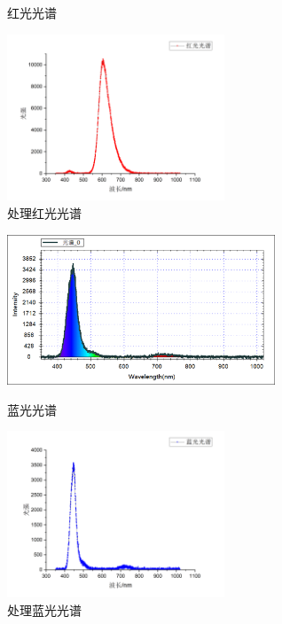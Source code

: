 \documentclass[11pt]{article}
\begin{document}
\begin{enumerate}
\begin{figure}[H]
\begin{minipage}[t]{0.55\linewidth}
            \caption{红光光谱}
        \end{minipage}
        \begin{minipage}[t]{0.44\linewidth}
            \centering
            \includegraphics[width=6.5cm]{Fig/21-红.png}
            \caption{处理红光光谱}
        \end{minipage}
    \end{figure}
    \begin{figure}[H]
        \centering
        \begin{minipage}[t]{0.55\linewidth}
            \centering
            \includegraphics[width=8cm]{Fig/22-蓝.png}
            \caption{蓝光光谱}
        \end{minipage}
        \begin{minipage}[t]{0.44\linewidth}
            \centering
            \includegraphics[width=6.5cm]{Fig/23-蓝.png}
            \caption{处理蓝光光谱}
        \end{minipage}
    \end{figure}


\end{enumerate}
\end{document}
